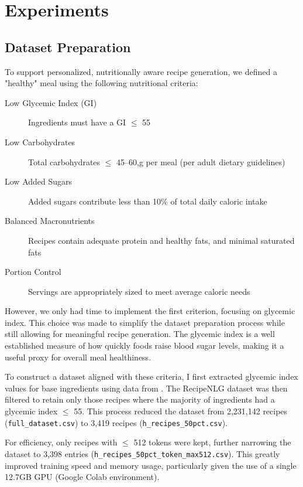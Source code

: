 \section{Experiments}
\subsection{Dataset Preparation}
To support personalized, nutritionally aware recipe generation, we defined a "healthy" meal using the following nutritional criteria:

\begin{description}
	\item[Low Glycemic Index (GI)] Ingredients must have a GI $\leq$ 55
	\item[Low Carbohydrates] Total carbohydrates $\leq$ 45--60,g per meal (per adult dietary guidelines)
	\item[Low Added Sugars] Added sugars contribute less than 10\% of total daily caloric intake
	\item[Balanced Macronutrients] Recipes contain adequate protein and healthy fats, and minimal saturated fats
	\item[Portion Control] Servings are appropriately sized to meet average caloric needs
\end{description}

However, we only had time to implement the first criterion, focusing on glycemic index. This choice was made to simplify the dataset preparation process while still allowing for meaningful recipe generation. The glycemic index is a well established measure of how quickly foods raise blood sugar levels, making it a useful proxy for overall meal healthiness.

To construct a dataset aligned with these criteria, I first extracted glycemic index values for base ingredients using data from \cite{foodstruct_glycemic_index}. The RecipeNLG dataset \cite{bien2020recipenlg} was then filtered to retain only those recipes where the majority of ingredients had a glycemic index $\leq$ 55. This process reduced the dataset from 2,231,142 recipes (\texttt{full\_dataset.csv}) to 3,419 recipes (\texttt{h\_recipes\_50pct.csv}).

For efficiency, only recipes with $\leq$ 512 tokens were kept, further narrowing the dataset to 3,398 entries (\texttt{h\_recipes\_50pct\_token\_max512.csv}). This greatly improved training speed and memory usage, particularly given the use of a single 12.7GB GPU (Google Colab environment).

